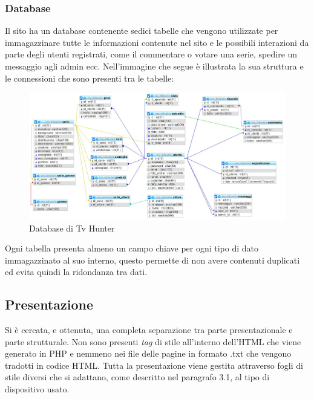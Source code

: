 \subsubsection{Database}

Il sito ha un database contenente  sedici tabelle che vengono utilizzate per immagazzinare  tutte le informazioni contenute nel sito e le possibili interazioni da parte degli utenti registrati, come il commentare o votare una serie, spedire un messaggio agli admin ecc. Nell'immagine che segue è illustrata la  sua struttura e le connessioni che sono presenti tra le tabelle:

\begin{figure}[H]
	\centerline{\includegraphics[scale= 0.40]{img/database.jpg}}
	\caption{Database di Tv Hunter}
\end{figure}

Ogni tabella presenta almeno un campo chiave per ogni tipo di dato immagazzinato al suo interno, questo permette di non avere contenuti duplicati ed evita quindi la ridondanza tra dati.

\subsection{Presentazione}
Si è cercata, e ottenuta, una completa separazione tra parte presentazionale e parte strutturale. Non sono presenti \textit{tag} di stile all’interno dell'HTML che viene generato in PHP e nemmeno nei file delle pagine in formato .txt che vengono tradotti in codice HTML. 
Tutta la presentazione viene gestita attraverso fogli di stile diversi che si adattano, come descritto nel paragrafo 3.1, al tipo di dispositivo usato.

